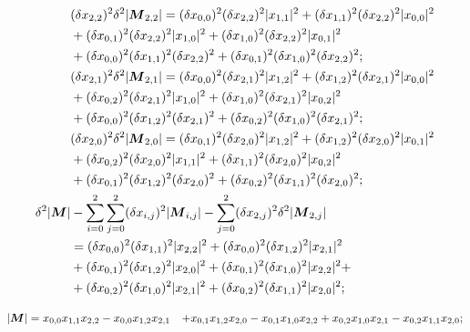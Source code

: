\documentclass[twoside]{article}
\numberwithin{equation}{section}
\begin{document}
\begin{align*}
& (\delta x_{2,2})^2 \delta^2 |\protect{\textrm{\boldmath $M$}}_{2,2}| = (\delta x_{0,0})^2 (\delta x_{2,2})^2 |x_{1,1}|^2 + (\delta x_{1,1})^2 (\delta x_{2,2})^2 |x_{0,0}|^2 \\
  &+  (\delta x_{0,1})^2 (\delta x_{2,2})^2 |x_{1,0}|^2 + (\delta x_{1,0})^2 (\delta x_{2,2})^2 |x_{0,1}|^2 \\
  &+ (\delta x_{0,0})^2 (\delta x_{1,1})^2 (\delta x_{2,2})^2 + (\delta x_{0,1})^2 (\delta x_{1,0})^2 (\delta x_{2,2})^2; \\
& (\delta x_{2,1})^2 \delta^2 |\protect{\textrm{\boldmath $M$}}_{2,1}| = (\delta x_{0,0})^2 (\delta x_{2,1})^2 |x_{1,2}|^2 + (\delta x_{1,2})^2 (\delta x_{2,1})^2 |x_{0,0}|^2 \\
  &+  (\delta x_{0,2})^2 (\delta x_{2,1})^2 |x_{1,0}|^2 + (\delta x_{1,0})^2 (\delta x_{2,1})^2 |x_{0,2}|^2 \\
  &+ (\delta x_{0,0})^2 (\delta x_{1,2})^2 (\delta x_{2,1})^2  + (\delta x_{0,2})^2 (\delta x_{1,0})^2 (\delta x_{2,1})^2; \\
& (\delta x_{2,0})^2 \delta^2 |\protect{\textrm{\boldmath $M$}}_{2,0}| = (\delta x_{0,1})^2 (\delta x_{2,0})^2 |x_{1,2}|^2 + (\delta x_{1,2})^2 (\delta x_{2,0})^2 |x_{0,1}|^2 \\
  &+  (\delta x_{0,2})^2 (\delta x_{2,0})^2 |x_{1,1}|^2 + (\delta x_{1,1})^2 (\delta x_{2,0})^2 |x_{0,2}|^2 \\
  &+ (\delta x_{0,1})^2 (\delta x_{1,2})^2 (\delta x_{2,0})^2 + (\delta x_{0,2})^2 (\delta x_{1,1})^2 (\delta x_{2,0})^2; \\
\delta^2 |\protect{\textrm{\boldmath $M$}}| & - \sum_{i=0}^{2} \sum_{j=0}^{2} (\delta x_{i,j})^2 |\protect{\textrm{\boldmath $M$}}_{i,j}| - \sum_{j=0}^{2} (\delta x_{2,j})^2 \delta^2 |\protect{\textrm{\boldmath $M$}}_{2,j}| \\
  &= (\delta x_{0,0})^2 (\delta x_{1,1})^2 |x_{2,2}|^2 + (\delta x_{0,0})^2 (\delta x_{1,2})^2 |x_{2,1}|^2 \\
  &+ (\delta x_{0,1})^2 (\delta x_{1,2})^2 |x_{2,0}|^2 + (\delta x_{0,1})^2 (\delta x_{1,0})^2 |x_{2,2}|^2 + \\
  &+ (\delta x_{0,2})^2 (\delta x_{1,0})^2 |x_{2,1}|^2 + (\delta x_{0,2})^2 (\delta x_{1,1})^2 |x_{2,0}|^2;
\end{align*}

\begin{align*}
|\protect{\textrm{\boldmath $M$}}| &= x_{0,0} x_{1,1} x_{2,2} - x_{0,0} x_{1,2} x_{2,1} 
	&+ x_{0,1} x_{1,2} x_{2,0} - x_{0,1} x_{1,0} x_{2,2}
    &+ x_{0,2} x_{1,0} x_{2,1} -  x_{0,2} x_{1,1} x_{2,0}; \\
\end{align*}
\end{document}
